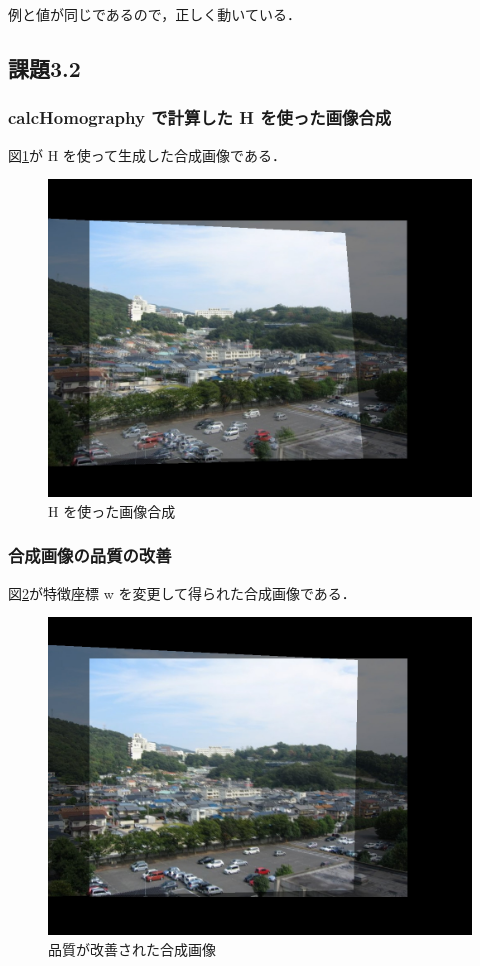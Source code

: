 \documentclass[autodetect-engine,dvi=dvipdfmx,ja=standard,
               a4j,11pt]{bxjsarticle}
\begin{document}
例と値が同じであるので，正しく動いている．




\subsection{課題3.2}
\subsubsection{calcHomography で計算した H を使った画像合成}
図\ref{fig:3.2_1.jpg}が H を使って生成した合成画像である．

\begin{figure}[h]
 \centering
 \includegraphics[scale=.3]{3.2_1.jpg}
 \caption{H を使った画像合成}
 \label{fig:3.2_1.jpg}
\end{figure}


\subsubsection{合成画像の品質の改善}
図\ref{fig:3-1.W-4.jpg}が特徴座標 w を変更して得られた合成画像である．

\begin{figure}[h]
 \centering
 \includegraphics[scale=.3]{3-1.W-4.jpg}
 \caption{品質が改善された合成画像}
 \label{fig:3-1.W-4.jpg}
\end{figure}
\end{document}
